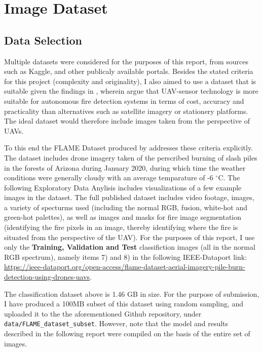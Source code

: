 \documentclass[a4paper,11pt]{article} %
\begin{document}
\section{Image Dataset}

\subsection{Data Selection}
Multiple datasets were considered for the purposes of this report, from sources such as Kaggle, and other publicaly available portals. Besides the stated
criteria for this project (complexity and originality), I also aimed to use a dataset that is suitable given the findings in , wherein  argue that UAV-sensor
technology is more suitable for autonomous fire detection systems in terms of cost, accuracy and practicality than alternatives such as satellite imagery or stationery platforms.
The ideal dataset would therefore include images taken from the perspective of UAVs.

\medskip

To this end the FLAME Dataset produced by  addresses these criteria explicitly. The dataset includes drone imagery taken of the perscribed burning
of slash piles in the forests of Arizona during January 2020, during which time the weather conditions were generally cloudy with an average temparature of -6 $^{\circ}$C. The following Exploratory Data Anylisis includes visualizations of a few example images in the dataset.
The full published dataset includes video footage, images, a variety of specturms used (including the normal RGB, fusion, white-hot and green-hot palettes), as well as images and masks for fire image segmentation (identifying the fire pixels in an image, thereby identifying where
the fire is situated from the perspective of the UAV). For the purposes of this report, I use only the \textbf{Training, Validation and Test} classifiction images (all in the normal RGB spectrum), namely items 7) and 8)
in the following IEEE-Dataport link: \url{https://ieee-dataport.org/open-access/flame-dataset-aerial-imagery-pile-burn-detection-using-drones-uavs}.

\medskip

The classification dataset above is 1.46 GB in size. For the purpose of submission, I have produced a 100MB subset of this dataset using random sampling, and uploaded it to the the aforementioned Github repository, under \verb!data/FLAME_dataset_subset!. However,
note that the model and results described in the following report were compiled on the basis of the entire set of images.
\end{document}
